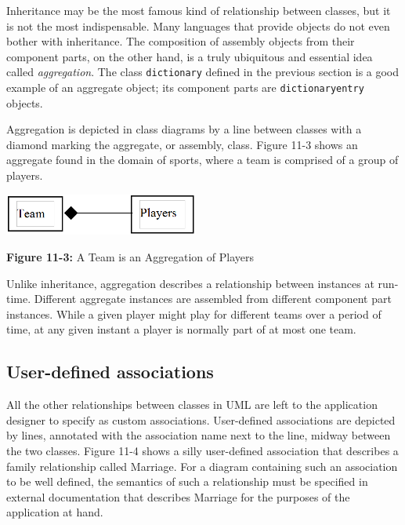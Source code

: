 Inheritance may be the most famous kind of relationship between classes,
but it is not the most indispensable. Many languages that provide
objects do not even bother with inheritance. The composition of
assembly objects from their component parts, on the other hand, is a
truly ubiquitous and essential idea called
\textit{aggregation}. The class \texttt{dictionary}
defined in the previous section is a good example of an aggregate
object; its component parts are \texttt{dictionaryentry} objects.

Aggregation is depicted in class diagrams by a line between classes with
a diamond marking the aggregate, or assembly, class. Figure 11-3
shows an aggregate found in the domain of sports, where a team is
comprised of a group of players.

\begin{center}
\includegraphics[width=2.52in,height=0.54in]{ub-img/aggregat.png} 

{\sffamily\bfseries Figure 11-3:}
{\sffamily A Team is an Aggregation of Players}
\end{center}

Unlike inheritance, aggregation describes a relationship between
instances at run-time. Different aggregate instances are assembled from
different component part instances. While a given player might play for
different teams over a period of time, at any given instant a player is
normally part of at most one team.

\subsection{User-defined associations}

All the other relationships between classes in UML are left
to the application designer to specify as custom associations.
User-defined associations are depicted by lines, annotated with the
association name next to the line, midway between the two classes.
Figure 11-4 shows a silly user-defined association that describes a
family relationship called Marriage. For a diagram containing such an
association to be well defined, the semantics of such a relationship
must be specified in external documentation that describes Marriage for
the purposes of the application at hand.

